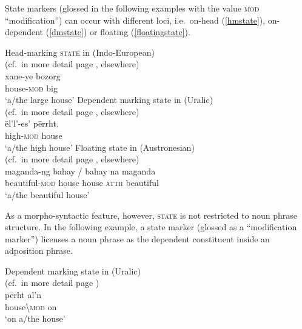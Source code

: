 State markers (glossed in the following examples with the value \textsc{mod} “modification”) can occur with different loci, i.e.~on-head (\ref{hmstate}), on-dependent (\ref{dmstate}) or floating (\ref{floatingstate}).
\begin{exe}
\ex
\begin{xlist}
\ex\label{hmstate} 
\rm{Head-marking \textsc{state} in  (Indo-European)}\\(cf.~in more detail page \pageref{persian constr state}, elsewhere)\\
\gll xane-ye bozorg\\
	house-\textsc{mod} big\\
\glt 	‘a/the large house’
\ex\label{dmstate}
\rm{Dependent marking state in  (Uralic)}\\(cf.~in more detail page \pageref{kildin attr.adj.sg}, elsewhere)\\
\gll 	ēl'l'-es' 		pērrht.\\
	high-\textsc{mod}	house\\
\glt	‘a/the high house’
\ex\label{floatingstate}
\rm{Floating state in  (Austronesian)}\\(cf.~in more detail page \pageref{tagalog linker}, elsewhere)\\
\gll maganda-ng bahay / bahay na maganda\\
	beautiful-\textsc{mod} house {} house \textsc{attr} beautiful\\
\glt	‘a/the beautiful house’
\end{xlist}
\end{exe}
As a morpho-syntactic feature, however, \textsc{state} is not restricted to noun phrase structure. In the following example, a state marker (glossed as a “modification marker”) licenses a noun phrase as the dependent constituent inside an adposition phrase.
\begin{exe}
\ex
\rm{Dependent marking state in  (Uralic)}\\(cf.~in more detail page \pageref{state ap kildin})\\
\gll 	pērht		al'n\\
	house\textbackslash\textsc{mod}	on\\
\glt 	‘on a/the house’
\end{exe}

